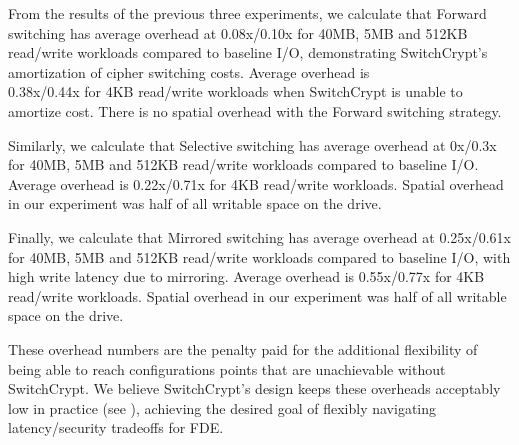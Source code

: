 From the results of the previous three experiments, we calculate that Forward
switching has average overhead at 0.08x/0.10x for 40MB, 5MB and 512KB read/write
workloads compared to baseline I/O, demonstrating SwitchCrypt's amortization of
cipher switching costs. Average overhead is\\0.38x/0.44x for 4KB read/write
workloads when SwitchCrypt is unable to amortize cost. There is no spatial
overhead with the Forward switching strategy.

Similarly, we calculate that Selective switching has average overhead at 0x/0.3x
for 40MB, 5MB and 512KB read/write workloads compared to baseline I/O. Average
overhead is 0.22x/0.71x for 4KB read/write workloads. Spatial overhead in our
experiment was half of all writable space on the drive.

Finally, we calculate that Mirrored switching has average overhead at
0.25x/0.61x for 40MB, 5MB and 512KB read/write workloads compared to baseline
I/O, with high write latency due to mirroring. Average overhead is 0.55x/0.77x
for 4KB read/write workloads. Spatial overhead in our experiment was half of all
writable space on the drive.

These overhead numbers are the penalty paid for the additional flexibility of
being able to reach configurations points that are unachievable without
SwitchCrypt. We believe SwitchCrypt's design keeps these overheads acceptably
low in practice (see ), achieving the desired goal of flexibly
navigating latency/security tradeoffs for FDE.

